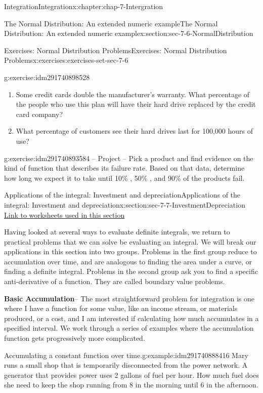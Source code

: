 \documentclass[oneside,10pt,]{book}
\newcommand{\terminology}[1]{\textbf{#1}}
\numberwithin{equation}{section}
\begin{document}
\begin{chapterptx}{Integration}{}{Integration}{}{}{x:chapter:chap-7-Intergration}
\begin{sectionptx}{The Normal Distribution: An extended numeric example}{}{The Normal Distribution: An extended numeric example}{}{}{x:section:sec-7-6-NormalDistribution}
\begin{exercises-subsection}{Exercises: Normal Distribution Problems}{}{Exercises: Normal Distribution Problems}{}{}{x:exercises:exercises-set-sec-7-6}
\begin{divisionexercise}{12}{}{}{g:exercise:idm291740898528}
\begin{enumerate}[label=(\alph*)]
\item{}Some credit cards double the manufacturer’s warranty.  What percentage of the people who use this plan will have their hard drive replaced by the credit card company?%
\item{}What percentage of customers see their hard drives last for 100,000 hours of use?%
\end{enumerate}
\end{divisionexercise}%
\begin{divisionexercise}{13}{}{}{g:exercise:idm291740893584}%
– Project – Pick a product and find evidence on the kind of function that describes its failure rate.  Based on that data, determine how long we expect it to take until 10\% , 50\% , and 90\%  of the products fail.%
\end{divisionexercise}%
\end{exercises-subsection}
\end{sectionptx}
%
%
\typeout{************************************************}
\typeout{************************************************}
%
\begin{sectionptx}{Applications of the integral: Investment and depreciation}{}{Applications of the integral: Investment and depreciation}{}{}{x:section:sec-7-7-InvestmentDepreciation}
\href{./Examples/Section-7-7-Examples.xlsx}{Link to worksheets used in this section}%
\par
Having looked at several ways to evaluate definite integrals, we return to practical problems that we can solve be evaluating an integral.  We will break our applications in this section into two groups.  Problems in the first group reduce to accumulation over time, and are analogous to finding the area under a curve, or finding a definite integral.  Problems in the second group ask you to find a specific anti-derivative of a function.  They are called boundary value problems.%
\par
\terminology{Basic Accumulation}– The most straightforward problem for integration is one where I have a function for some value, like an income stream, or materials produced, or a cost, and I am interested if calculating how much accumulates in a specified interval.  We work through a series of examples where the accumulation function gets progressively more complicated.%
\begin{example}{Accumulating a constant function over time.}{g:example:idm291740888416}%
Mary runs a small shop that is temporarily disconnected from the power network.  A generator that provides power uses 2 gallons of fuel per hour.  How much fuel does she need to keep the shop running from 8 in the morning until 6 in the afternoon.%

\end{example}
\end{sectionptx}
\end{chapterptx}
\end{document}

